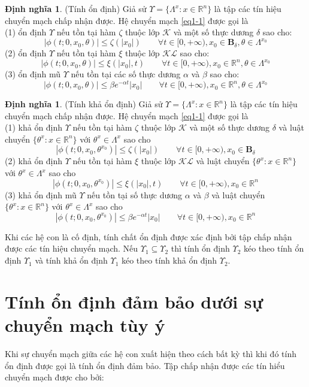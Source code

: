 \documentclass[14pt,a4paper,oneside]{report}		%
\theoremstyle{definition}
\newtheorem{define}[theorem]{Định nghĩa}
\begin{document}
\begin{define} \label{def1-1} (Tính ổn định) Giả sử $\Upsilon = \{\Lambda^x:x\in\mathbb{R}^n\}$ là tập các tín hiệu chuyển mạch chấp nhận được. Hệ chuyển mạch \ref{eq1-1} được gọi là \\
(1) ổn định $\Upsilon$ nếu tồn tại hàm $\zeta$ thuộc lớp $\mathcal{K}$ và một số thực dương $\delta$ sao cho:
$$|\phi(t;0,x_0,\theta)|\leq\zeta(|x_0|)\qquad\forall t \in [0,+\infty ), x_0 \in\mathbf{B}_\delta , \theta \in\Lambda^{x_0}$$
(2) ổn định $\Upsilon$ nếu tồn tại hàm $\xi$ thuộc lớp $\mathcal{KL}$ sao cho:
$$|\phi(t;0,x_0,\theta)|\leq\xi(|x_0|,t)\qquad\forall t \in [0,+\infty ), x_0 \in\mathbb{R}^n , \theta \in\Lambda^{x_0}$$
(3) ổn định mũ $\Upsilon$ nếu tồn tại các số thực dương $\alpha$ và $\beta$ sao cho:
$$|\phi(t;0,x_0,\theta)|\leq \beta e^{-\alpha t}|x_0|\qquad\forall t \in [0,+\infty ), x_0 \in\mathbb{R}^n , \theta \in\Lambda^{x_0}$$
\end{define}

\begin{define} (Tính khả ổn định) Giả sử $\Upsilon = \{\Lambda^x:x\in\mathbb{R}^n\}$ là tập các tín hiệu chuyển mạch chấp nhận được. Hệ chuyển mạch \ref{eq1-1} được gọi là \\
(1) khả ổn định $\Upsilon$ nếu tồn tại hàm $\zeta$ thuộc lớp $\mathcal{K}$ và một số thực dương $\delta$ và luật chuyển $\{\theta^x:x\in\mathbb{R}^n\}$ với $\theta^x\in\Lambda^x$ sao cho
$$|\phi(t;0,x_0,\theta^{x_0})|\leq\zeta(|x_0|)\qquad\forall t \in [0,+\infty ), x_0 \in\mathbf{B}_\delta$$
(2) khả ổn định $\Upsilon$ nếu tồn tại hàm $\xi$ thuộc lớp $\mathcal{KL}$ và luật chuyển $\{\theta^x:x\in\mathbb{R}^n\}$ với $\theta^x\in\Lambda^x$ sao cho
$$|\phi(t;0,x_0,\theta^{x_0})|\leq\xi(|x_0|,t)\qquad\forall t \in [0,+\infty ), x_0 \in\mathbb{R}^n$$
(3) khả ổn định mũ $\Upsilon$ nếu tồn tại số thực dương $\alpha$ và $\beta$ và luật chuyển $\{\theta^x:x\in\mathbb{R}^n\}$ với $\theta^x\in\Lambda^x$ sao cho
$$|\phi(t;0,x_0,\theta^{x_0})|\leq \beta e^{-\alpha t}|x_0|\qquad\forall t \in [0,+\infty ), x_0 \in\mathbb{R}^n$$
\end{define}

Khi các hệ con là cố định, tính chất ổn định được xác định bởi tập chấp nhận được các tín hiệu chuyển mạch. Nếu $\Upsilon_1\subseteq\Upsilon_2$ thì tính ổn định $\Upsilon_2$ kéo theo tính ổn định $\Upsilon_1$ và tính khả ổn định $\Upsilon_1$ kéo theo tính khả ổn định $\Upsilon_2$.

\section{Tính ổn định đảm bảo dưới sự chuyển mạch tùy ý}
Khi sự chuyển mạch giữa các hệ con xuất hiện theo cách bất kỳ thì khi đó tính ổn định được gọi là tính ổn định đảm bảo. Tập chấp nhận được các tín hiểu chuyển mạch được cho bởi:
\end{document}
